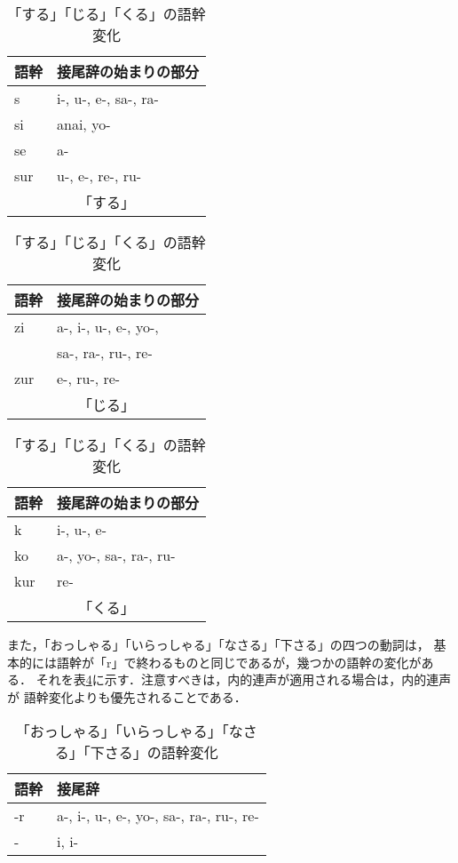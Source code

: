 \begin{table}
\begin{minipage}[t]{5cm}
\begin{tabular}{|l|l|} \hline
語幹 & 接尾辞の始まりの部分 \\ \hline
s	&	i-, u-, e-, sa-, ra- \\
si	&	anai, yo- \\ 
se	&	a- \\
sur	&	u-, e-, re-, ru- \\ \hline
\multicolumn{2}{c}{「する」} \\
\end{tabular}
\end{minipage}
\hspace{-3mm}
\begin{minipage}[t]{5cm}
\begin{tabular}{|l|l|} \hline
語幹 & 接尾辞の始まりの部分 \\ \hline
zi	&	a-, i-, u-, e-, yo-, \\
&	sa-, ra-, ru-, re- \\
zur	&	e-, ru-, re- \\ \hline
\multicolumn{2}{c}{「じる」} \\
\end{tabular}
\end{minipage}
\hspace{-3mm}
\begin{minipage}[t]{5cm}
\begin{tabular}{|l|l|} \hline
語幹 & 接尾辞の始まりの部分 \\ \hline
k	&	i-, u-, e- \\
ko	&	a-, yo-, sa-, ra-, ru- \\
kur	&	re- \\ \hline
\multicolumn{2}{c}{「くる」} \\
\end{tabular}
\end{minipage}
\caption{「する」「じる」「くる」の語幹変化}
\label{henka}
\end{table}


また，「おっしゃる」「いらっしゃる」「なさる」「下さる」の四つの動詞は，
基本的には語幹が「r」で終わるものと同じであるが，幾つかの語幹の変化がある．
それを表\ref{nasaru}に示す．注意すべきは，内的連声が適用される場合は，内的連声が
語幹変化よりも優先されることである．

\begin{table}
\begin{center}
\begin{tabular}{|l|l|} \hline
語幹 & 接尾辞 \\ \hline
-r	&	a-, i-, u-, e-, yo-, sa-, ra-, ru-, re- \\
-	&	i, i- \\
\hline
\end{tabular}
\end{center}
\caption{「おっしゃる」「いらっしゃる」「なさる」「下さる」の語幹変化}
\label{nasaru}
\end{table}


